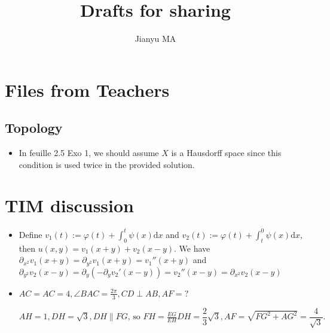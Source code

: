 \documentclass[]{article}
\title{Drafts for sharing }
\author{Jianyu MA}
\theoremstyle{remark}
\begin{document}
\maketitle


\section{Files from Teachers}
\subsection{Topology}
\begin{itemize}
	\item In feuille 2.5 Exo 1, we should assume $ X $ is a Hausdorff space since this condition is used twice in the provided solution.
\end{itemize}
\section{TIM discussion}
\begin{itemize}
	\item Define $ v_{1}(t) :=\varphi(t) + \int_{0}^{t} \psi(x) \mathrm{d} x
	$ and $ v_{2}(t) :=\varphi(t) + \int_{t}^{0} \psi(x) \mathrm{d} x
	$, then $ u(x,y) = v_{1}(x+y) + v_{2}(x-y) $. We have $ \partial_{x^2}{v_{1}(x+y)} = \partial_{y^2}{v_{1}(x+y)} = v_{1}''(x+y)$ and $ \partial_{y^2}{v_{2}(x-y)} = \partial_{y}(-\partial_{y}v_{2}'(x-y))=v_{2}''(x-y)= \partial_{x^2}{v_{2}(x-y)}$
	\item $ AC = AC = 4,\angle BAC = \frac{2\pi}{3}, CD\perp AB, AF=? $

	$ AH = 1, DH = \sqrt{3}, DH \parallel FG \text{, so } FH = \frac{EG}{EH} DH = \dfrac{2}{3} \sqrt{3}, AF = \sqrt{FG^2 + AG^2}=\dfrac{4}{\sqrt{3}}. $
\end{itemize}
\end{document}

